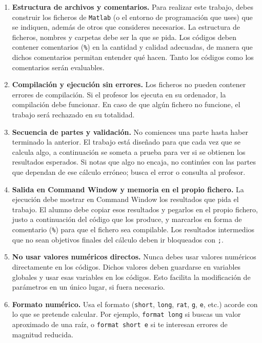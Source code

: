 \documentclass[12pt]{article}
\begin{document}
\begin{enumerate}
  \item \textbf{Estructura de archivos y comentarios.}  
  Para realizar este trabajo, debes construir los ficheros de \texttt{Matlab} (o el entorno de programación que uses) que se indiquen, además de otros que consideres necesarios. La estructura de ficheros, nombres y carpetas debe ser la que se pida. Los códigos deben contener comentarios (\texttt{\%}) en la cantidad y calidad adecuadas, de manera que dichos comentarios permitan entender qué hacen. Tanto los códigos como los comentarios serán evaluables.

  \item \textbf{Compilación y ejecución sin errores.}  
  Los ficheros no pueden contener errores de compilación. Si el profesor los ejecuta en su ordenador, la compilación debe funcionar. En caso de que algún fichero no funcione, el trabajo será rechazado en su totalidad.
  
  \item \textbf{Secuencia de partes y validación.}  
  No comiences una parte hasta haber terminado la anterior. El trabajo está diseñado para que cada vez que se calcula algo, a continuación se someta a prueba para ver si se obtienen los resultados esperados. Si notas que algo no encaja, no continúes con las partes que dependan de ese cálculo erróneo; busca el error o consulta al profesor.

  \item \textbf{Salida en Command Window y memoria en el propio fichero.}  
  La ejecución debe mostrar en Command Window los resultados que pida el trabajo. El alumno debe copiar esos resultados y pegarlos en el propio fichero, justo a continuación del código que los produce, y marcarlos en forma de comentario (\texttt{\%}) para que el fichero sea compilable. Los resultados intermedios que no sean objetivos finales del cálculo deben ir bloqueados con \texttt{;}.

  \item \textbf{No usar valores numéricos directos.}  
  Nunca debes usar valores numéricos directamente en los códigos. Dichos valores deben guardarse en variables globales y usar esas variables en los códigos. Esto facilita la modificación de parámetros en un único lugar, si fuera necesario.

  \item \textbf{Formato numérico.}  
  Usa el formato (\texttt{short}, \texttt{long}, \texttt{rat}, \texttt{g}, \texttt{e}, etc.) acorde con lo que se pretende calcular. Por ejemplo, \texttt{format long} si buscas un valor aproximado de una raíz, o \texttt{format short e} si te interesan errores de magnitud reducida.


\end{enumerate}
\end{document}
